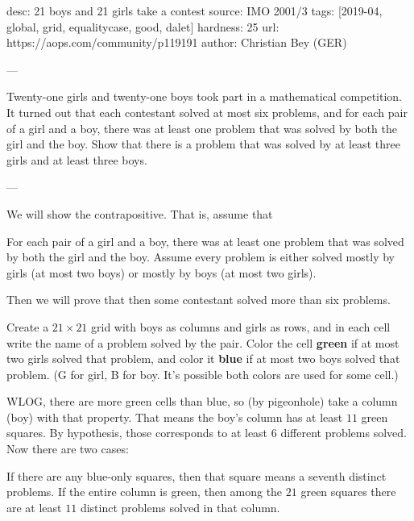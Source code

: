 desc: 21 boys and 21 girls take a contest
source: IMO 2001/3
tags: [2019-04, global, grid, equalitycase, good, dalet]
hardness: 25
url: https://aops.com/community/p119191
author: Christian Bey (GER)

---

Twenty-one girls and twenty-one boys took part in a mathematical competition.
It turned out that each contestant solved at most six problems,
and for each pair of a girl and a boy,
there was at least one problem that was solved by both the girl and the boy.
Show that there is a problem that was solved by at least three girls and at least three boys.

---

We will show the contrapositive.
That is, assume that
\begin{itemize}
  \ii For each pair of a girl and a boy,
  there was at least one problem that was
  solved by both the girl and the boy.
  \ii Assume every problem is either solved
  mostly by girls (at most two boys)
  or mostly by boys (at most two girls).
\end{itemize}
Then we will prove that then some contestant
solved more than six problems.

Create a $21 \times 21$ grid with boys as columns
and girls as rows, and in each cell
write the name of a problem solved by the pair.
Color the cell \textbf{green} if at most two girls solved that problem,
and color it \textbf{blue} if at most two boys solved that problem.
(G for girl, B for boy.
It's possible both colors are used for some cell.)

WLOG, there are more green cells than blue,
so (by pigeonhole) take a column (boy) with that property.
That means the boy's column has at least $11$ green squares.
By hypothesis, those corresponds to at least $6$ different problems
solved. Now there are two cases:
\begin{itemize}
  \ii If there are any blue-only squares,
  then that square means a seventh distinct problems.
  \ii If the entire column is green,
  then among the $21$ green squares
  there are at least $11$ distinct problems solved
  in that column.
\end{itemize}

